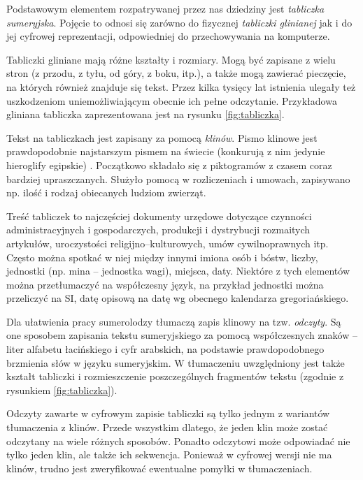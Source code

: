 Podstawowym elementem rozpatrywanej przez nas dziedziny jest \emph{tabliczka sumeryjska}. 
Pojęcie to odnosi się zarówno do fizycznej \emph{tabliczki glinianej} jak i do jej cyfrowej reprezentacji, 
odpowiedniej do przechowywania na komputerze. 

Tabliczki gliniane mają różne kształty i rozmiary. 
Mogą być zapisane z wielu stron (z przodu, z tyłu, od góry, z boku, itp.), a także mogą zawierać pieczęcie, 
na których również znajduje się tekst. Przez kilka tysięcy lat istnienia ulegały też uszkodzeniom uniemożliwiającym 
obecnie ich pełne odczytanie.
Przykładowa gliniana tabliczka zaprezentowana jest na rysunku \ref{fig:tabliczka}.

Tekst na tabliczkach jest zapisany za pomocą \emph{klinów}. Pismo klinowe jest prawdopodobnie najstarszym pismem na świecie 
(konkurują z nim jedynie hieroglify egipskie)  \cite{kuckenburg}. Początkowo składało się z piktogramów z czasem coraz bardziej upraszczanych.
Służyło pomocą w rozliczeniach i umowach, zapisywano np. ilość i rodzaj obiecanych ludziom zwierząt.

Treść tabliczek to najczęściej dokumenty urzędowe dotyczące czynności administracyjnych i gospodarczych, 
produkcji i dystrybucji rozmaitych artykułów, uroczystości religijno--kulturowych, umów cywilnoprawnych itp. \cite{powalka}
Często można spotkać w niej między innymi imiona osób i bóstw, liczby, jednostki (np. mina -- jednostka wagi), %
miejsca, daty. Niektóre z tych elementów można przetłumaczyć na współczesny język, na przykład jednostki można przeliczyć na SI, 
datę opisową na datę wg obecnego kalendarza gregoriańskiego. 

Dla ułatwienia pracy sumerolodzy tłumaczą zapis klinowy na tzw. \emph{odczyty}. 
Są one sposobem zapisania tekstu sumeryjskiego za pomocą współczesnych znaków -- liter alfabetu łacińskiego i cyfr arabskich, 
na podstawie prawdopodobnego brzmienia słów w języku sumeryjskim. 
W tłumaczeniu uwzględniony jest także kształt tabliczki i rozmieszczenie poszczególnych fragmentów tekstu 
(zgodnie z rysunkiem \ref{fig:tabliczka}). 
 
Odczyty zawarte w cyfrowym zapisie tabliczki są tylko jednym z wariantów tłumaczenia z klinów. 
Przede wszystkim dlatego, że jeden klin może zostać odczytany na wiele różnych sposobów. 
Ponadto odczytowi może odpowiadać nie tylko jeden klin, ale także ich sekwencja. 
Ponieważ w cyfrowej wersji nie ma klinów, trudno jest zweryfikować ewentualne pomyłki w tłumaczeniach.

